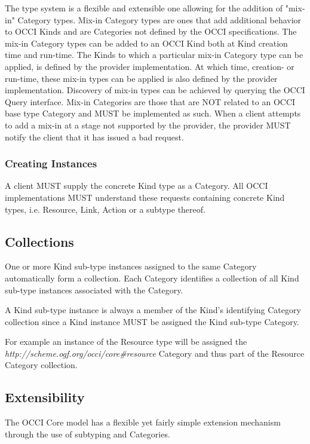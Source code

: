 \documentclass[10pt,a4paper]{article}
\begin{document}
The type system is a flexible and extensible one allowing for the addition of "mix-in" Category types. Mix-in Category types are ones that add additional behavior to OCCI Kinds and are Categories not defined by the OCCI specifications. The mix-in Category types can be added to an OCCI Kind both at Kind creation time and run-time. The Kinds to which a particular mix-in Category type can be applied, is defined by the provider implementation. At which time, creation- or run-time, these mix-in types can be applied is also defined by the provider implementation. Discovery of mix-in types can be achieved by querying the OCCI Query interface. Mix-in Categories are those that are NOT related to an OCCI base type Category and MUST be implemented as such. When a client attempts to add a mix-in at a stage not supported by the provider, the provider MUST notify the client that it has issued a bad request.

\subsubsection{Creating Instances}
A client MUST supply the concrete Kind type as a Category. All OCCI implementations MUST understand these requests containing concrete Kind types, i.e. Resource, Link, Action or a subtype thereof.

\subsection{Collections}
\label{sec:collection}

One or more Kind sub-type instances assigned to the same Category automatically
form a collection.  Each Category identifies a collection of all Kind sub-type
instances associated with the Category.

A Kind sub-type instance is always a member of the Kind's identifying Category
collection since a Kind instance MUST be assigned the Kind sub-type Category.

For example an instance of the Resource type will be assigned the
\textit{http://scheme.ogf.org/occi/core\#resource} Category and thus part of the
Resource Category collection.


\subsection{Extensibility}
The OCCI Core model has a flexible yet fairly simple extension mechanism through the use of subtyping and Categories. 
\end{document}

